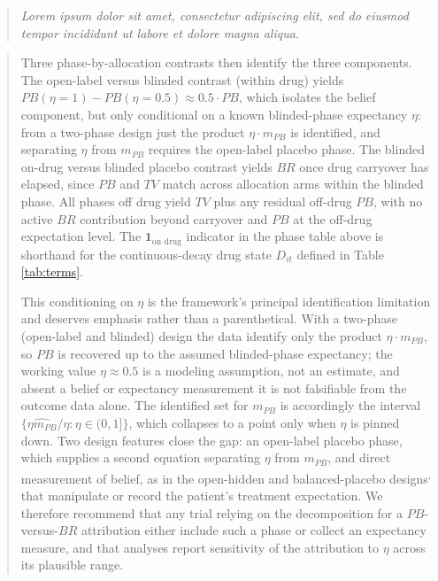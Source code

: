 \documentclass[
  11pt,
]{article}
\newenvironment{rgt}{%
  \begin{quote}\small\itshape\color[RGB]{20,60,160}}{%
  \end{quote}}
\newenvironment{orig}{%
  \begin{quote}\normalsize\color[gray]{0.55}}{%
  \end{quote}}
\begin{document}
\begin{rgt}
Lorem ipsum dolor sit amet, consectetur adipiscing elit, sed do eiusmod tempor incididunt ut labore et dolore magna aliqua.

\end{rgt}

\begin{orig}
Three phase-by-allocation contrasts then identify the three
components. The open-label versus blinded contrast (within drug)
yields \(PB(\eta = 1) - PB(\eta = 0.5) \approx 0.5 \cdot PB\),
which isolates the belief component, but only conditional on a
known blinded-phase expectancy \(\eta\): from a two-phase design
just the product \(\eta \cdot m_{PB}\) is identified, and
separating \(\eta\) from \(m_{PB}\) requires the open-label placebo
phase. The blinded on-drug versus blinded placebo contrast
yields \(BR\) once drug carryover has elapsed, since \(PB\) and \(TV\)
match across allocation arms within the blinded phase. All
phases off drug yield \(TV\) plus any residual off-drug \(PB\), with
no active \(BR\) contribution beyond carryover and \(PB\) at the
off-drug expectation level. The \(\mathbf{1}_{\text{on drug}}\)
indicator in the phase table above is shorthand for the
continuous-decay drug state \(D_{it}\) defined in Table
\ref{tab:terms}.

This conditioning on \(\eta\) is the framework's principal
identification limitation and deserves emphasis rather than a
parenthetical. With a two-phase (open-label and blinded) design the
data identify only the product \(\eta \cdot m_{PB}\), so \(PB\) is
recovered up to the assumed blinded-phase expectancy; the working
value \(\eta \approx 0.5\) is a modeling assumption, not an estimate,
and absent a belief or expectancy measurement it is not falsifiable
from the outcome data alone. The identified set for \(m_{PB}\) is
accordingly the interval \(\{\widehat{\eta m_{PB}} / \eta : \eta \in
(0,1]\}\), which collapses to a point only when \(\eta\) is pinned down.
Two design features close the gap: an open-label placebo phase, which
supplies a second equation separating \(\eta\) from \(m_{PB}\), and direct
measurement of belief, as in the open-hidden and balanced-placebo
designs\textsuperscript{,} that manipulate or record the
patient's treatment expectation. We therefore recommend that any trial
relying on the decomposition for a \(PB\)-versus-\(BR\) attribution either
include such a phase or collect an expectancy measure, and that
analyses report sensitivity of the attribution to \(\eta\) across its
plausible range.

\end{orig}
\end{document}
